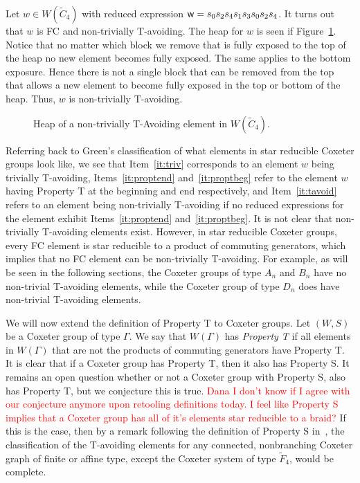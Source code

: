 \begin{example}
Let $w \in W(\widetilde{C}_4)$ with reduced expression $\mathsf{w}=s_0s_2s_4s_1s_3s_0s_2s_4$. It turns out that $w$ is FC and non-trivially T-avoiding. The heap for $w$ is seen if Figure~\ref{fig:sandwich1}. Notice that no matter which block we remove that is fully exposed to the top of the heap no new element becomes fully exposed. The same applies to the bottom exposure. Hence there is not a single block that can be removed from the top that allows a new element to become fully exposed in the top or bottom of the heap. Thus, $w$ is non-trivially T-avoiding. 
\begin{figure}[h!]
\centering
{}
\caption{Heap of a non-trivially T-Avoiding element in $W(\widetilde{C}_4)$.}\label{fig:sandwich1}	
\end{figure}
\end{example}

Referring back to Green's classification of what elements in star reducible Coxeter groups look like, we see that Item~\ref{it:triv} corresponds to an element $w$ being trivially T-avoiding, Items~\ref{it:proptend} and~\ref{it:proptbeg} refer to the element $w$ having Property T at the beginning and end respectively, and Item~\ref{it:tavoid} refers to an element being non-trivially T-avoiding if no reduced expressions for the element exhibit Items~\ref{it:proptend} and~\ref{it:proptbeg}. It is not clear that non-trivially T-avoiding elements exist. However, in star reducible Coxeter groups, every FC element is star reducible to a product of commuting generators, which implies that no FC element can be non-trivially T-avoiding. For example, as will be seen in the following sections, the Coxeter groups of type $A_n$ and $B_n$ have no non-trivial T-avoiding elements, while the Coxeter group of type $D_n$ does have non-trivial T-avoiding elements. 

We will now extend the definition of Property T to Coxeter groups. Let $(W,S)$ be a Coxeter group of type $\Gamma$. We say that $W(\Gamma)$ has \emph{Property T} if all elements in $W(\Gamma)$ that are not the products of commuting generators have Property T. It is clear that if a Coxeter group has Property T, then it also has Property S. It remains an open question whether or not a Coxeter group with Property S, also has Property T, but we conjecture this is true. \textcolor{red}{Dana I don't know if I agree with our conjecture anymore upon retooling definitions today. I feel like Property S implies that a Coxeter group has all of it's elements star reducible to a braid?} If this is the case, then by a remark following the definition of Property S in~\cite{Green2007}, the classification of the T-avoiding elements for any connected, nonbranching Coxeter graph of finite or affine type, except the Coxeter system of type $\widetilde{F}_4$, would be complete. 

